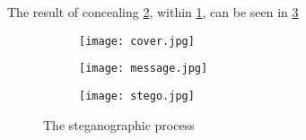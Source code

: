 The result of concealing \ref{img2}, within \ref{img1}, can be seen in \ref{img3}

\begin{figure}[]
	\centering
	\begin{subfigure}[b]{.3\linewidth}
		\texttt{[image: cover.jpg]}
		\label{img1}
	\end{subfigure}
	\hspace{.02\linewidth}
	\begin{subfigure}[b]{.15\linewidth}
		\texttt{[image: message.jpg]}
		\label{img2}
	\end{subfigure}
	\hspace{.02\linewidth}

	\begin{subfigure}[b]{.3\linewidth}
		\texttt{[image: stego.jpg]}
		\label{img3}
	\end{subfigure}
	\caption{The steganographic process}\label{LSBDemo}
\end{figure} 


